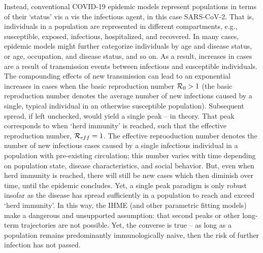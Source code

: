 Instead, conventional COVID-19 epidemic
models represent populations in terms of their `status' vis
a vis the infectious agent, in this case SARS-CoV-2.  That is, individuals
in a population are represented in different compartments, e.g.,
susceptible, exposed, infectious,
hospitalized, and recovered.  In many cases, epidemic models
might further categorize individuals by age and disease status, or age, occupation,
and disease status, and so on.  As a result, increases in cases
are a result of transmission events between infectious
and susceptible individuals.  The compounding effects 
of new transmission can lead to an exponential increases in cases 
when the basic reproduction number ${\cal{R}}_0>1$ (the
basic reproduction number denotes the average number of new
infections caused by a single, typical individual in an otherwise
susceptible population).  Subsequent
spread, if left unchecked, would yield a single peak -- in theory. That 
peak corresponds to when `herd immunity' is reached, such
that the effective reproduction number, ${\cal{R}}_{eff}=1$.
The effective reprooduction number denotes the number of new
infectious cases caused by a single infectious individual
in a population with pre-existing circulation; this number varies with
time depending on population state, disease characteristics, and 
social behavior.
But, even when herd immunity is reached, there will still be new cases which then
diminish over time, until the epidemic concludes.  
Yet, a single peak paradigm is
only robust insofar as the disease has spread
sufficiently in a population to reach and exceed `herd immunity'.
In this way, the IHME (and other parametric fitting models) make
a dangerous and unsupported assumption: that second peaks
or other long-term trajectories are not possible.  Yet, the converse
is true -- as long as a population remains predominantly immunologically
naive, then the risk of further infection has not passed. 
